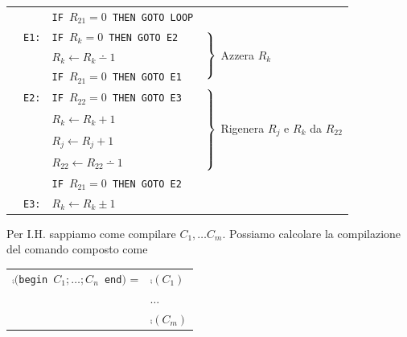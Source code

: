 \begin{itemize}
\begin{center}
\begin{tabular}{l|r l|l}
			&& \texttt{IF $R_{21} = 0$ THEN GOTO LOOP} & \\
			& \texttt{E1:} & \texttt{IF $R_k = 0$ THEN GOTO E2} &\multirow{3}{*}{\hspace{-.2cm}
				$\begin{rcases}
					\phantom{}\\
					\phantom{}\\
					\phantom{}\\
				\end{rcases}$ Azzera $R_k$
				}\\
			&& $R_k \leftarrow R_k \dotminus 1$ & \\
			&& \texttt{IF $R_{21} = 0$ THEN GOTO E1} & \\
			& \texttt{E2:} & \texttt{IF $R_{22} = 0$ THEN GOTO E3} & \multirow{4}{*}{\hspace{-.2cm}
			$\begin{rcases}
				\phantom{}\\
				\phantom{}\\
				\phantom{}\\
				\phantom{}\\
				\phantom{}\\
			\end{rcases}$ Rigenera $R_j$ e $R_k$ da $R_{22}$
			} \\
			&& $R_k \leftarrow R_k + 1$ & \\
			&& $R_j \leftarrow R_j + 1$ & \\
			&& $R_{22} \leftarrow R_{22} \dotminus 1$ & \\
			&& \texttt{IF $R_{21} = 0$ THEN GOTO E2} & \\ 
			& \texttt{E3:} & $R_k \leftarrow R_k \pm 1$ & \\
			\cline{2-3} 
		\end{tabular}\vspace{.5cm}
	\end{center}
\end{itemize}

Per I.H. sappiamo come compilare $C_1, \dots C_m$. Possiamo calcolare la compilazione del comando composto come
\begin{center}
	\begin{tabular}{r |l|}
		\cline{2-2}
		$\comp($\texttt{begin $C_1; \dots; C_n$ end$)$} = & $\comp (C_1)$ \\
		& $\dots$ \\
		& $\comp(C_m)$ \\
		\cline{2-2}
	\end{tabular}
\end{center}

